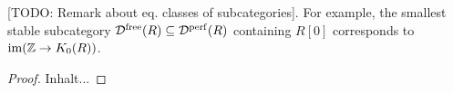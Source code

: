 \documentclass[a4paper, 10pt, oneside, DIV=9, chapterprefix=true, numbers=enddot,bibliography=totoc]{scrbook}
\begin{document}
[TODO: Remark about eq. classes of subcategories]. For example, the smallest stable subcategory $\mathcal{D}^\mathrm{free}(R)\subseteq \mathcal{D}^{\mathrm{perf}}(R)$ containing $R[0]$ corresponds to $\im(\IZ\morphism K_0(R))$. 
\begin{proof}
	Inhalt...
\end{proof}


\backmatter{}
\printbibliography
\end{document}
